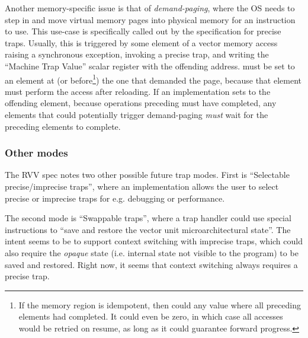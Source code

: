 Another memory-specific issue is that of \emph{demand-paging}, where the OS needs to step in and move virtual memory pages into physical memory for an instruction to use.
This use-case is specifically called out by the specification for precise traps.
Usually, this is triggered by some element of a vector memory access raising a synchronous exception, invoking a precise trap, and writing the ``Machine Trap Value'' scalar register with the offending address\cite[Section 3.1.21]{specification-RISCV-vol2-20211203}.
 must be set to an element at (or before\footnote{If the memory region is idempotent, then  could any value where all preceding elements had completed. It could even be zero, in which case all accesses would be retried on resume, as long as it could guarantee forward progress.}) the one that demanded the page, because that element must perform the access after reloading.
If an implementation sets  to the offending element, because operations preceding  must have completed, any elements that could potentially trigger demand-paging \emph{must} wait for the preceding elements to complete.



\subsubsection{Other modes}
The RVV spec notes two other possible future trap modes.
First is \enquote{Selectable precise/imprecise traps}, where an implementation allows the user to select precise or imprecise traps for e.g. debugging or performance.

The second mode is \enquote{Swappable traps}, where a trap handler could use special instructions to \enquote{save and restore the vector unit microarchitectural state}.
The intent seems to be to support context switching with imprecise traps, which could also require the \emph{opaque} state (i.e. internal state not visible to the program) to be saved and restored.
Right now, it seems that context switching always requires a precise trap.

